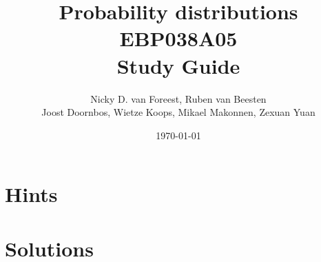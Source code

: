 \documentclass[a4paper,12pt]{book}
\author{Nicky D. van Foreest, Ruben van Beesten \\
  Joost Doornbos, Wietze Koops, Mikael Makonnen, Zexuan Yuan
}
\date{\today}
\title{Probability distributions EBP038A05\\
Study Guide}
\begin{document}
\maketitle
\tableofcontents



\setcounter{chapter}{6}






\clearpage
\chapter{Hints}

\clearpage
\chapter{Solutions}


\end{document}
